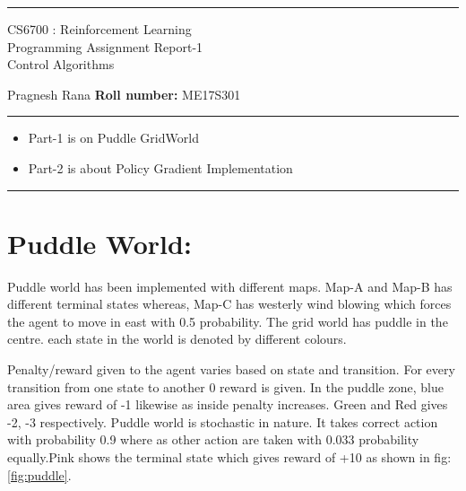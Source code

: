 \documentclass[preprint,12pt]{elsarticle}
\begin{document}
\hrule
\vspace{1mm}
\noindent 
\begin{center}
{\Large CS6700 : Reinforcement Learning} \\

{\large Programming Assignment Report-1} \\
{\large Control Algorithms   \hfill }
\end{center}
\vspace{1mm}
\noindent 



 Pragnesh Rana \hfill {\bf Roll number:} ME17S301
\vspace{2mm}
\hrule

{\small

\begin{itemize}\itemsep0mm
\item Part-1 is on Puddle GridWorld
\item Part-2 is about Policy Gradient Implementation 
\end{itemize}
}
\hrule



\section{Puddle World:}

 Puddle world has been implemented with different maps. Map-A and Map-B has different terminal states whereas, Map-C has westerly wind blowing which forces the agent to move in east with 0.5 probability. The grid world has puddle in the centre. each state in the world is denoted by different colours.\cite{git}

Penalty/reward given to the agent varies based on state and transition.  For every transition from one state to another 0 reward is given. In the puddle zone, blue area gives reward of -1 likewise as inside penalty increases. Green and Red gives -2, -3 respectively. Puddle world is stochastic in nature. It takes correct action with probability 0.9 where as other action are taken with 0.033 probability equally.Pink shows the terminal state which gives reward of +10 as shown in fig:\ref{fig:puddle}.
\end{document}
